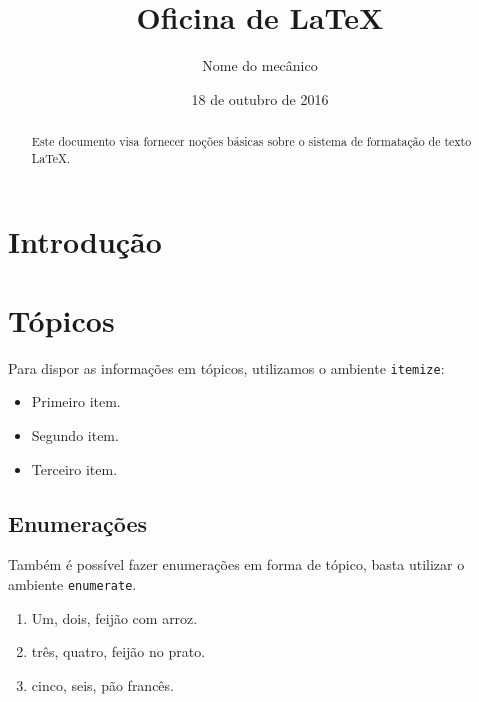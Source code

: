 \documentclass[twocolumn]{article}
\author{Nome do mecânico} %
\date{18 de outubro de 2016} %
\title{Oficina de \LaTeX} %
\begin{document}
\maketitle %

\begin{abstract}
Este documento visa fornecer noções básicas sobre o sistema de formatação de texto \LaTeX.
\end{abstract}
\section{Introdução}
\lipsum[3]
\section{Tópicos}
Para dispor as informações em tópicos, utilizamos o ambiente {\tt itemize}:
\begin{itemize}
	\item Primeiro item.
	\item Segundo item.
	\item Terceiro item.
\end{itemize}

\subsection{Enumerações}

Também é possível fazer enumerações em forma de tópico, basta utilizar o ambiente {\tt enumerate}.
\begin{enumerate}
	\item Um, dois, feijão com arroz.
	\item três, quatro, feijão no prato.
	\item cinco, seis, pão francês.
\end{enumerate}
\end{document}
